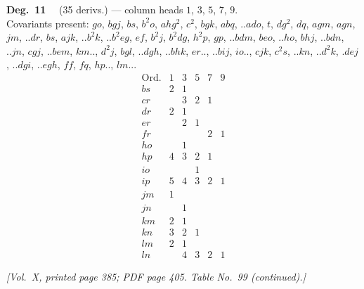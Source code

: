 \documentclass[11pt]{article}
\begin{document}
\noindent\textbf{Deg.~11} \ \ (35 derivs.) --- column heads $1$, $3$, $5$, $7$, $9$. \\
Covariants present: $go$, $bgj$, $bs$, $b^{2}o$, $ahg^{2}$, $c^{2}$, $bgk$, $abq$, $..ado$, $t$, $dg^{2}$, $dq$, $agm$, $agn$, $jm$, $..dr$, $bs$, $ajk$, $..b^{2}k$, $..b^{2}eg$, $ef$, $b^{2}j$, $b^{2}dg$, $h^{2}p$, $gp$, $..bdm$, $beo$, $..ho$, $bhj$, $..bdn$, $..jn$, $cgj$, $..bem$, $km..$, $d^{2}j$, $bgl$, $..dgh$, $..bhk$, $er..$, $..bij$, $io..$, $cjk$, $c^{2}s$, $..kn$, $..d^{2}k$, $.dej$, $..dgi$, $..egh$, $ff$, $fq$, $hp..$, $lm..$.
\[
\begin{array}{l|ccccc}
\text{Ord.} & 1 & 3 & 5 & 7 & 9 \\\hline
bs & 2 & 1 & & & \\
cr & & 3 & 2 & 1 & \\
dr & 2 & 1 & & & \\
er & & 2 & 1 & & \\
fr & & & & 2 & 1 \\
ho & & 1 & & & \\
hp & 4 & 3 & 2 & 1 & \\
io & & & 1 & & \\
ip & 5 & 4 & 3 & 2 & 1 \\
jm & 1 & & & & \\
jn & & 1 & & & \\
km & 2 & 1 & & & \\
kn & 3 & 2 & 1 & & \\
lm & 2 & 1 & & & \\
ln & & 4 & 3 & 2 & 1
\end{array}
\]

\newpage

\noindent\textit{[Vol.~X, printed page 385; PDF page 405. Table No.~99 (continued).]}

\bigskip
\end{document}

